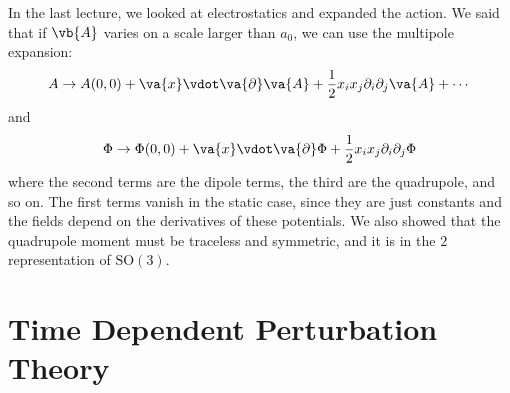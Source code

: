 \documentclass[a4paper,twoside,master.tex]{subfiles}
\begin{document}


In the last lecture, we looked at electrostatics and expanded the action. We said that if $ \vb{A} $ varies on a scale larger than $ a_0 $, we can use the multipole expansion:
\begin{equation}
    A \to A(0,0) + \va{x} \vdot \va{\partial} \va{A} + \frac{1}{2} x_i x_j \partial_i \partial_j \va{A} +\cdots
\end{equation}
and
\begin{equation}
    \Phi \to \Phi(0,0) + \va{x} \vdot \va{\partial} \Phi + \frac{1}{2} x_i x_j \partial_i \partial_j \Phi
\end{equation}
where the second terms are the dipole terms, the third are the quadrupole, and so on. The first terms vanish in the static case, since they are just constants and the fields depend on the derivatives of these potentials. We also showed that the quadrupole moment must be traceless and symmetric, and it is in the $ 2 $ representation of $\text{SO}(3)$.

\section{Time Dependent Perturbation Theory}
\label{sec:time_dependent_perturbation_theory}
\end{document}
